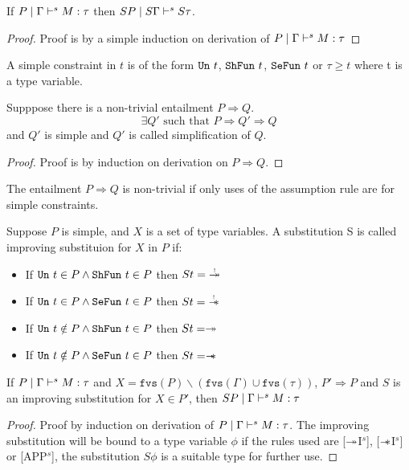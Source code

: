 \begin{lemma}\label{lemma:syntax-closed-under-sub}
  If $P \mid \Gamma \vdash^s M:\tau$ then $S P \mid S \Gamma \vdash^s S \tau$.
\end{lemma}
\begin{proof}
  Proof is by a simple induction on derivation of $P \mid \Gamma \vdash^s M:\tau$
\end{proof}

\begin{defn}
  A simple constraint in $t$ is of the form $\texttt{Un}\ t$, $\texttt{ShFun}\ t$, $\texttt{SeFun}\ t$ or $\tau \geq t$ where t is a type variable.
\end{defn}

\begin{lemma}
  Supppose there is a non-trivial entailment $P \Rightarrow Q$.  $$\exists Q' \text{\ such that\ } P \Rightarrow Q' \Rightarrow Q$$ and $Q'$ is simple and
  $Q'$ is called simplification of $Q$.
\end{lemma}
\begin{proof}
  Proof is by induction on derivation on $P \Rightarrow Q$.
\end{proof}

\begin{defn}
  The entailment $P \Rightarrow Q$ is non-trivial if only uses of the assumption rule are for simple constraints.
\end{defn}

\begin{defn}
  Suppose $P$ is simple, and $X$ is a set of type variables.
  A substitution S is called improving substituion for $X$ in $P$ if:
  \begin{itemize}
  \item If $\texttt{Un}\ t \in P \wedge \texttt{ShFun}\ t \in P$ then $S t = \tightoverset{\scalebox{0.5}{!}}{\shimp}$
  \item If $\texttt{Un}\ t \in P \wedge \texttt{SeFun}\ t \in P$ then $S t = \tightoverset{\scalebox{0.5}{!}}{\sepimp}$
  \item If $\texttt{Un}\ t \notin P \wedge \texttt{ShFun}\ t \in P$ then $S t = \twoheadrightarrow$
  \item If $\texttt{Un}\ t \notin P \wedge \texttt{SeFun}\ t \in P$ then $S t = \mathrel{-\mkern-6mu*}$
  \end{itemize}
\end{defn}

\begin{lemma}\label{lemma:improving-sub}
  If $P \mid \Gamma \vdash^s M:\tau$ and $X = \texttt{fvs}(P) \backslash (\texttt{fvs}(\Gamma) \cup \texttt{fvs}(\tau))$,
  $P' \Rightarrow P$ and $S$ is an improving substitution for $X \in P'$, then $S P \mid \Gamma \vdash^s M :\tau$
\end{lemma}
\begin{proof}
  Proof by induction on derivation of $P \mid \Gamma \vdash^s M:\tau$.
  The improving substitution will be bound to a type variable $\phi$ if the rules used are [$\twoheadrightarrow$I$^s$], [$\mathrel{-\mkern-6mu*}$I$^s$] or [APP$^s$], the
  substitution $S \phi$ is a suitable type for further use.
\end{proof}

